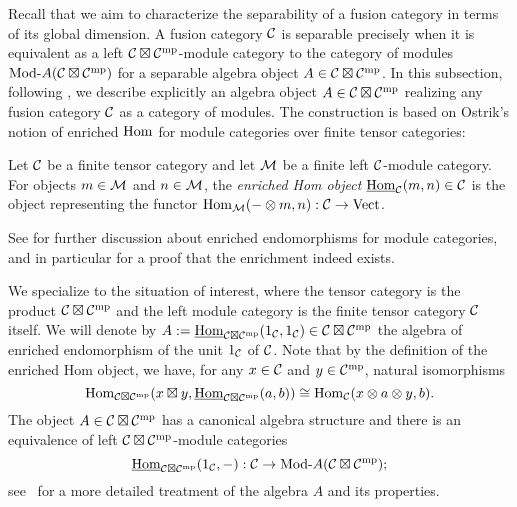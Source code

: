 \documentclass{amsart}
\begin{document}
Recall that we aim to characterize the separability of a fusion category in terms of its global dimension.  A fusion category $\mathcal C$ is separable precisely when it is equivalent as a left $\mathcal C \boxtimes \mathcal C^{\mathrm{mp}}$-module category to the category of modules $\Mod{}{A}(\cC \boxtimes \cC^\mp)$ for a separable algebra object $A \in \mathcal C \boxtimes \mathcal C^{\mathrm{mp}}$.    In this subsection, following \cite{MR2097289}, we describe explicitly an algebra object $A \in \mathcal C \boxtimes \mathcal C^{\mathrm{mp}}$ realizing any fusion category $\mathcal C$ as a category of modules.  The construction is based on Ostrik's notion of enriched $\operatorname{Hom}$ for module categories over finite tensor categories: 
\begin{definition}
Let $\mathcal C$ be a finite tensor category and let $\mathcal M$ be a finite left $\mathcal C$-module category.  For objects $m \in \mathcal M$ and $n \in \mathcal M$, the \emph{enriched Hom object} $\operatorname{\underline{Hom}}_\mathcal C(m,n) \in \mathcal C$ is the object representing the functor $\operatorname{Hom}_\mathcal M(- \otimes m,n): \mathcal C \rightarrow \mathrm{Vect}$.
\end{definition}
\nid See \cite{MR1976459, EO-ftc, EGNO, BTP} for further discussion about enriched endomorphisms for module categories, and in particular for a proof that the enrichment indeed exists.

We specialize to the situation of interest, where the tensor category is the product $\mathcal C \boxtimes \mathcal C^{\mathrm{mp}}$ and the left module category is the finite tensor category $\mathcal C$ itself.  We will denote by $A := \operatorname{\underline{Hom}}_{\mathcal C \boxtimes \mathcal C^{\mathrm{mp}}}(1_\mathcal C,1_\mathcal C) \in \mathcal C \boxtimes \mathcal C^{\mathrm{mp}}$ the algebra of enriched endomorphism of the unit $1_\mathcal C$ of $\mathcal C$.  Note that by the definition of the enriched Hom object, we have, for any $x \in \mathcal C$ and $y \in \mathcal C^{\mathrm{mp}}$, natural isomorphisms
\[
\operatorname{Hom}_{\mathcal C \boxtimes \mathcal C^{\mathrm{mp}}}(x \boxtimes y, \operatorname{\underline{Hom}}_{\mathcal C \boxtimes \mathcal C^{\mathrm{mp}}}(a,b)) \cong \operatorname{Hom}_\mathcal C(x \otimes a \otimes y,b).
\]
The object $A \in \mathcal C \boxtimes \mathcal C^{\mathrm{mp}}$ has a canonical algebra structure and there is an equivalence of left $\mathcal C \boxtimes \mathcal C^{\mathrm{mp}}$-module categories
\[
\IHom_{\cC \boxtimes \cC^\mp}(1_\cC,-) : \cC \ra \Mod{}{A}(\cC \boxtimes \cC^\mp);
\]
see~\cite[\S 2]{MR2097289} for a more detailed treatment of the algebra $A$ and its properties.

\end{document}
